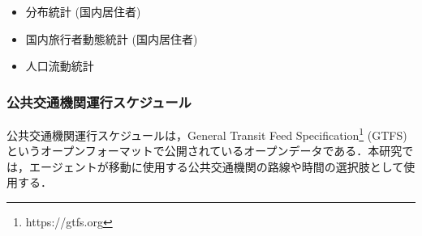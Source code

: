 \begin{itemize}
  \item 分布統計 (国内居住者)
  \item 国内旅行者動態統計 (国内居住者)
  \item 人口流動統計
\end{itemize}

\subsubsection{公共交通機関運行スケジュール}
公共交通機関運行スケジュールは，General Transit Feed Specification\footnote{https://gtfs.org} (GTFS) というオープンフォーマットで公開されているオープンデータである．本研究では，エージェントが移動に使用する公共交通機関の路線や時間の選択肢として使用する．
